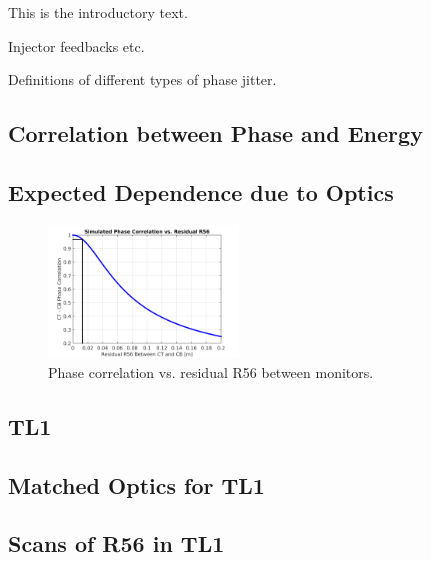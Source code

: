 
This is the introductory text.


Injector feedbacks etc.

Definitions of different types of phase jitter.


\subsection{Correlation between Phase and Energy}
\label{ss:corrPhaseEnergy}

\subsection{Expected Dependence due to Optics}
\label{ss:r56Sim}

\begin{figure}
  \centering
  \includegraphics[width=0.45\textwidth]{Figures/R56_corrSim}
  \caption{Phase correlation vs. residual R56 between monitors.}
  \label{f:R56_corrSim}
\end{figure}


\subsection{TL1}
\label{ss:tl1}

\subsection{Matched Optics for TL1}
\label{ss:tl1Optics}

\subsection{Scans of R56 in TL1}
\label{ss:r56Scans}

